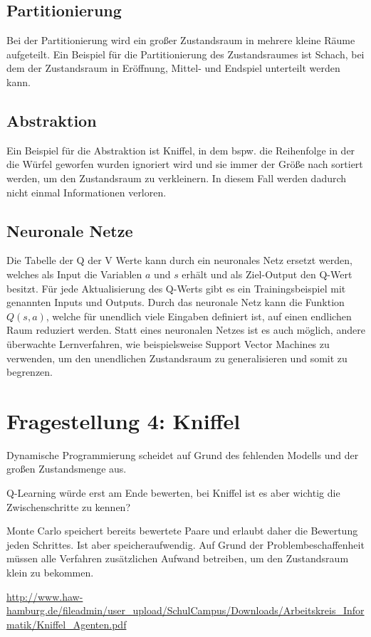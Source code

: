 \documentclass[10pt]{scrartcl}
\begin{document}
\subsection{Partitionierung}
Bei der Partitionierung wird ein großer Zustandsraum in mehrere kleine Räume aufgeteilt. Ein Beispiel für die Partitionierung des Zustandsraumes ist Schach, bei dem der Zustandsraum in Eröffnung, Mittel- und Endspiel unterteilt werden kann. 

\subsection{Abstraktion}
Ein Beispiel für die Abstraktion ist Kniffel, in dem bspw. die Reihenfolge in der die Würfel geworfen wurden ignoriert wird und sie immer der Größe nach sortiert werden, um den Zustandsraum zu verkleinern. In diesem Fall werden dadurch nicht einmal Informationen verloren.

\subsection{Neuronale Netze}
Die Tabelle der Q der V Werte kann durch ein neuronales Netz ersetzt werden, welches als Input die Variablen $a$ und $s$ erhält und als Ziel-Output den Q-Wert besitzt. Für jede Aktualisierung des Q-Werts gibt es ein Trainingsbeispiel mit genannten Inputs und Outputs. Durch das neuronale Netz kann die Funktion $Q(s,a)$, welche für unendlich viele Eingaben definiert ist, auf einen endlichen Raum reduziert werden.
Statt eines neuronalen Netzes ist es auch möglich, andere überwachte Lernverfahren, wie beispielsweise Support Vector Machines zu verwenden, um den unendlichen Zustandsraum zu generalisieren und somit zu begrenzen.



\section{Fragestellung 4: Kniffel}
Dynamische Programmierung scheidet auf Grund des fehlenden Modells und der großen Zustandsmenge aus.

Q-Learning würde erst am Ende bewerten, bei Kniffel ist es aber wichtig die Zwischenschritte zu kennen?

Monte Carlo speichert bereits bewertete Paare und erlaubt daher die Bewertung jeden Schrittes. Ist aber speicheraufwendig.
Auf Grund der Problembeschaffenheit müssen alle Verfahren zusätzlichen Aufwand betreiben, um den Zustandsraum klein zu bekommen.

\url{http://www.haw-hamburg.de/fileadmin/user_upload/SchulCampus/Downloads/Arbeitskreis_Informatik/Kniffel_Agenten.pdf}
\listoftodos
\end{document}
